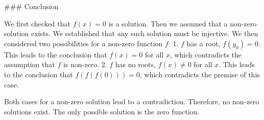 ### Conclusion

We first checked that $f(x)=0$ is a solution.
Then we assumed that a non-zero solution exists. We established that any such solution must be injective.
We then considered two possibilities for a non-zero function $f$:
1.  $f$ has a root, $f(y_0)=0$. This leads to the conclusion that $f(x)=0$ for all $x$, which contradicts the assumption that $f$ is non-zero.
2.  $f$ has no roots, $f(x) \neq 0$ for all $x$. This leads to the conclusion that $f(f(f(0))) = 0$, which contradicts the premise of this case.

Both cases for a non-zero solution lead to a contradiction. Therefore, no non-zero solutions exist.
The only possible solution is the zero function.